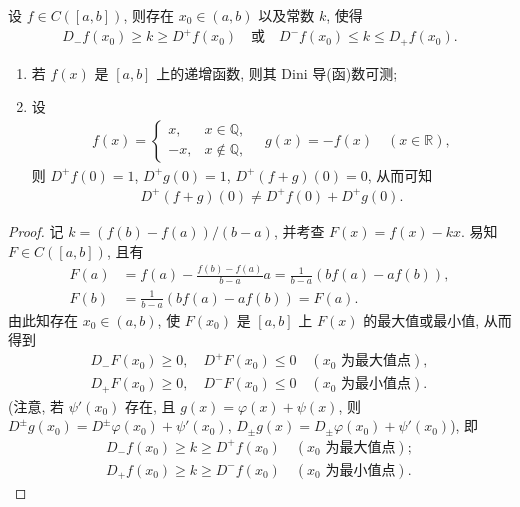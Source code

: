 \documentclass[../../main.tex]{subfiles}%
\begin{document}
\begin{example}
设 $f\in C([a,b])$, 则存在 $x_0\in(a,b)$ 以及常数 $k$, 使得
\begin{align*}
D_-f(x_0)\geqslant k\geqslant D^+f(x_0) \quad \text{或} \quad D^-f(x_0)\leqslant k\leqslant D_+f(x_0).
\end{align*}
\end{example}
\begin{remark}
\begin{enumerate}[(1)]
\item 若 $f(x)$ 是 $[a,b]$ 上的递增函数, 则其 Dini 导(函)数可测;
\item 设
\begin{align*}
f(x) =
\begin{cases}
x, & x\in\mathbb{Q}, \\
-x, & x\notin \mathbb{Q},
\end{cases}
\quad g(x) = -f(x) \quad (x\in\mathbb{R}),
\end{align*}
则 $D^+f(0)=1$, $D^+g(0)=1$, $D^+(f+g)(0)=0$, 从而可知
\begin{align*}
D^+(f+g)(0)\neq D^+f(0)+D^+g(0).
\end{align*}
\end{enumerate}
\end{remark}
\begin{proof}

记 $k=(f(b)-f(a))/(b-a)$, 并考查 $F(x)=f(x)-kx$. 易知 $F\in C([a,b])$, 且有
\begin{align*}
F(a) &= f(a)-\frac{f(b)-f(a)}{b-a}a = \frac{1}{b-a}(bf(a)-af(b)), \\
F(b) &= \frac{1}{b-a}(bf(a)-af(b)) = F(a).
\end{align*}
由此知存在 $x_0\in(a,b)$, 使 $F(x_0)$ 是 $[a,b]$ 上 $F(x)$ 的最大值或最小值, 从而得到
\begin{align*}
D_-F(x_0)\geqslant 0,\quad D^+F(x_0)\leqslant 0 \quad (x_0 \text{ 为最大值点}), \\
D_+F(x_0)\geqslant 0,\quad D^-F(x_0)\leqslant 0 \quad (x_0 \text{ 为最小值点}).
\end{align*}
(注意, 若 $\psi'(x_0)$ 存在, 且 $g(x)=\varphi(x)+\psi(x)$, 则 $D^\pm g(x_0)=D^\pm\varphi(x_0)+\psi'(x_0)$, $D_\pm g(x)=D_\pm\varphi(x_0)+\psi'(x_0)$), 即
\begin{align*}
D_-f(x_0)\geqslant k\geqslant D^+f(x_0) \quad (x_0 \text{ 为最大值点}); \\
D_+f(x_0)\geqslant k\geqslant D^-f(x_0) \quad (x_0 \text{ 为最小值点}).
\end{align*}

\end{proof}
\end{document}

